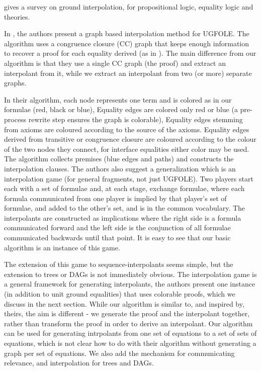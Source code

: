 \cite{BonacinaJohansson2015} gives a survey on ground interpolation, for propositional logic, equality logic and theories.

In \cite{FuchsGoelGrundyKrsticTinelli2012}, the authors present a graph based interpolation method for UGFOLE. 
The algorithm uses a congruence closure (CC) graph that keeps enough information to recover a proof for each equality derived (as in \cite{DBLP:conf/rta/NieuwenhuisO05}). 
The main difference from our algorithm is that they use a single CC graph (the proof) and extract an interpolant from it, while we extract an interpolant from two (or more) separate graphs.

In their algorithm, each node represents one term and is colored as in our formulae (red, black or blue),
Equality edges are colored only red or blue (a pre-process rewrite step ensures the graph is colorable),
Equality edges stemming from axioms are coloured according to the source of the axioms.
Equality edges derived from transitive or congruence closure are coloured according to the colour of the two nodes they connect,
for interface equalities either color may be used.
The algorithm collects  premises (blue edges and paths) and constructs the interpolation clauses.
The authors also suggest a generalization which is an interpolation game (for general fragments, not just UGFOLE).
Two players start each with a set of formulae and, at each stage, exchange formulae, where each formula communicated from one player is implied by that player's set of formulae, and added to the other's set, and is in the common vocabulary. 
The interpolants are constructed as implications where the right side is a formula communicated forward and the left side is the conjunction of all formulae communicated backwards until that point. It is easy to see that our basic algorithm is an instance of this game. 

The extension of this game to sequence-interpolants seems simple, but the extension to trees or DAGs is not immediately obvious.
The interpolation game is a general framework for generating interpolants, 
the authors present one instance (in addition to unit ground equalities) that uses colorable proofs, which we discuss in the next section.
While our algorithm is similar to, and inspired by, theirs, the aim is different - we generate the proof and the interpolant together, rather than transform the proof in order to derive an interpolant. Our algorithm can be used for generating intrpolants from one set of equations to a set of sets of equations, which is not clear how to do with their algorithm without generating a graph per set of equations. We also add the mechanism for communicating relevance, and interpolation for trees and DAGs.

